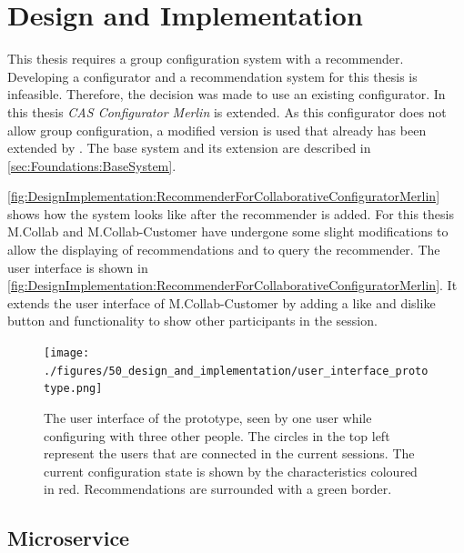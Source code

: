 \chapter{Design and Implementation}
\label{ch:DesignImplementation}

This thesis requires a group configuration system with a recommender. Developing a configurator and a recommendation system for this thesis is infeasible. Therefore, the decision was made to use an existing configurator. In this thesis \emph{CAS Configurator Merlin} \cite{IndustrySpecificProduct2020} is extended. As this configurator does not allow group configuration, a modified version is used that already has been extended by \citeauthor{raabKollaborativeProduktkonfigurationEchtzeit2019} \cite{raabKollaborativeProduktkonfigurationEchtzeit2019}. The base system and its extension are described in \autoref{sec:Foundations:BaseSystem}.

\autoref{fig:DesignImplementation:RecommenderForCollaborativeConfiguratorMerlin} shows how the system looks like after the recommender is added. For this thesis M.Collab and M.Collab-Customer have undergone some slight modifications to allow the displaying of recommendations and to query the recommender. The user interface is shown in \autoref{fig:DesignImplementation:RecommenderForCollaborativeConfiguratorMerlin}. It extends the user interface of M.Collab-Customer by adding a like and dislike button and functionality to show other participants in the session.

\begin{figure}
    \centering
    \texttt{[image: ./figures/50\_design\_and\_implementation/user\_interface\_prototype.png]}
    \caption{The user interface of the prototype, seen by one user while configuring with three other people. The circles in the top left represent the users that are connected in the current sessions. The current configuration state is shown by the characteristics coloured in red. Recommendations are surrounded with a green border.}
    \label{fig:DesignImplementation:UserInterface}
\end{figure}


\section{Microservice}
\label{sec:DesignImplementation:Microservice}

